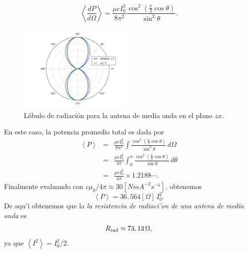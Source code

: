 \begin{equation}
 \left\langle\frac{dP}{d\Omega}\right\rangle=\frac{\mu c I_0^2}{8\pi^2}\frac{\cos^2\left(\frac{\pi}{2}\cos\theta\right)}{\sin^2\theta}.
\end{equation}
%
\begin{figure}[H]
\centerline{\includegraphics[width=0.5\textwidth]{fig/fig-antena-media-onda.pdf}}
 \caption{L\'obulo de radiaci\'on para la antena de media onda en el plano $zx$.}
\label{fig:lobulo_antena}
\end{figure}


En este caso, la potencia promedio total es dada por
\begin{eqnarray}
 \left\langle P\right\rangle
&=&\frac{\mu c I_0^2}{8\pi^2}\int\frac{\cos^2\left(\frac{\pi}{2}\cos\theta\right)}{\sin^2\theta}\,d\Omega \\
&=&\frac{\mu c I_0^2}{4\pi}\int_0^\pi\frac{\cos^2\left(\frac{\pi}{2}\cos\theta\right)}{\sin\theta}\,d\theta\\
&=&\frac{\mu c I_0^2}{4\pi}\times 1.2188\cdots .
\end{eqnarray}
Finalmente evaluando con $c\mu_0/4\pi\approx 30 [NmA^{-2}s^{-1}]$, obtenemos
\begin{equation}
 \left\langle P\right\rangle
=36,564[\Omega]\,I_0^2.
\end{equation}
De aqu'i obtenemos que la \textit{la resistencia de radiaci'on de una antena de media onda} es
\begin{equation}
 R_{\rm rad}\approx 73,13\,\Omega,
\end{equation}
ya que $\left\langle I^2\right\rangle=I_0^2/2$.